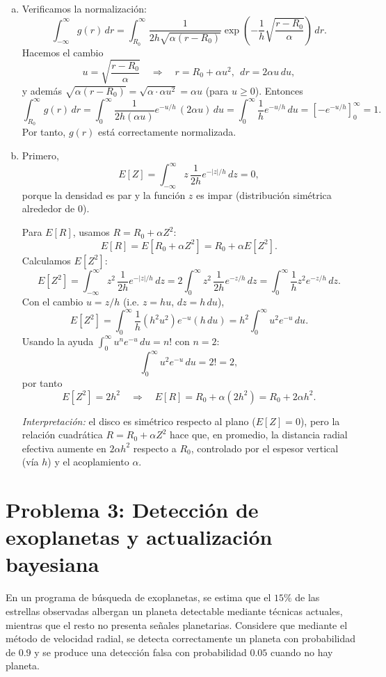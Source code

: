 \documentclass[a4paper]{article}
\begin{document}
\begin{enumerate}[a.]
\textit{Observación sobre $r=R_0$:} este valor corresponde únicamente a $z=0$, donde no se puede aplicar la expresión anterior del Jacobiano. Aunque la densidad crece sin límite al acercarse a $R_0$ por la derecha, su integral es finita, como se comprobará en el siguiente inciso. Además, $P(R=R_0)=P(Z=0)=0$, porque $Z$ es continua. Por ello, asignar $g(R_0)=0$ no altera ninguna probabilidad.



\item Verificamos la normalización:
$$
\int_{-\infty}^{\infty} g(r)\,dr=\int_{R_0}^{\infty}\frac{1}{2h\sqrt{\alpha(r-R_0)}}
\exp\!\left(-\frac{1}{h}\sqrt{\frac{r-R_0}{\alpha}}\right)\,dr.
$$
Hacemos el cambio
$$
u=\sqrt{\frac{r-R_0}{\alpha}}\quad\Longrightarrow\quad r=R_0+\alpha u^2,\ \ dr=2\alpha u\,du,
$$
y además $\sqrt{\alpha(r-R_0)}=\sqrt{\alpha\cdot \alpha u^2}=\alpha u$ (para $u\ge 0$). Entonces
$$
\int_{R_0}^{\infty} g(r)\,dr
=\int_{0}^{\infty}\frac{1}{2h(\alpha u)}e^{-u/h}\,(2\alpha u)\,du
=\int_0^\infty \frac{1}{h}e^{-u/h}\,du
=\left[-e^{-u/h}\right]_{0}^{\infty}=1.
$$
Por tanto, $g(r)$ está correctamente normalizada.

\item Primero,
$$
E[Z]=\int_{-\infty}^{\infty} z\,\frac{1}{2h}e^{-|z|/h}\,dz=0,
$$
porque la densidad es par y la función $z$ es impar (distribución simétrica alrededor de $0$).

Para $E[R]$, usamos $R=R_0+\alpha Z^2$:
$$
E[R]=E[R_0+\alpha Z^2]=R_0+\alpha E[Z^2].
$$
Calculamos $E[Z^2]$:
$$
E[Z^2]=\int_{-\infty}^{\infty} z^2\,\frac{1}{2h}e^{-|z|/h}\,dz
=2\int_{0}^{\infty} z^2\,\frac{1}{2h}e^{-z/h}\,dz
=\int_0^\infty \frac{1}{h}z^2 e^{-z/h}\,dz.
$$
Con el cambio $u=z/h$ (i.e. $z=hu$, $dz=h\,du$),
$$
E[Z^2]=\int_0^\infty \frac{1}{h}(h^2u^2)e^{-u}(h\,du)
=h^2\int_0^\infty u^2 e^{-u}\,du.
$$
Usando la ayuda $\int_0^\infty u^n e^{-u}\,du=n!$ con $n=2$:
$$
\int_0^\infty u^2 e^{-u}\,du=2!=2,
$$
por tanto
$$
E[Z^2]=2h^2
\quad\Longrightarrow\quad
E[R]=R_0+\alpha(2h^2)=R_0+2\alpha h^2.
$$

\textit{Interpretación:} el disco es simétrico respecto al plano ($E[Z]=0$), pero la relación cuadrática $R=R_0+\alpha Z^2$ hace que, en promedio, la distancia radial efectiva aumente en $2\alpha h^2$ respecto a $R_0$, controlado por el espesor vertical (vía $h$) y el acoplamiento $\alpha$.
\end{enumerate}

\section{Problema 3: Detección de exoplanetas y actualización bayesiana}
En un programa de búsqueda de exoplanetas, se estima que el $15\%$ de las estrellas observadas albergan un planeta detectable mediante técnicas actuales, mientras que el resto no presenta señales planetarias. Considere que mediante el método de velocidad radial, se detecta correctamente un planeta con probabilidad de $0.9$ y se produce una detección falsa con probabilidad $0.05$ cuando no hay planeta.
\end{document}
